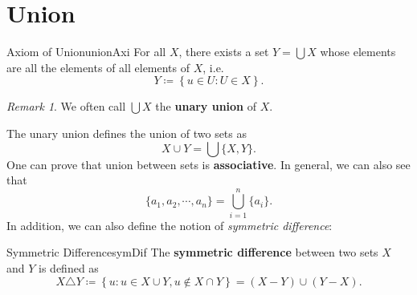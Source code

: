 \documentclass[math]{amznotes}
\theoremstyle{remark}
\newtheorem*{remark}{Remark}
\begin{document}
\section{Union}
\begin{axibox}{Axiom of Union}{unionAxi}
    For all $X$, there exists a set $Y = \bigcup X$ whose elements are all the elements of all elements of $X$, i.e.
    \begin{displaymath}
        Y \coloneqq \left\{u \in U \colon U \in X\right\}.
    \end{displaymath}
\end{axibox}
\begin{notebox}
    \begin{remark}
        We often call $\bigcup X$ the {\color{red} \textbf{unary union}} of $X$.
    \end{remark}
\end{notebox}
The unary union defines the union of two sets as 
\begin{equation*}
    X \cup Y = \bigcup\{X, Y\}.
\end{equation*}
One can prove that union between sets is \textbf{associative}. In general, we can also see that
\begin{equation*}
    \{a_1, a_2, \cdots, a_n\} = \bigcup_{i = 1}^n \{a_i\}.
\end{equation*}
In addition, we can also define the notion of \textit{symmetric difference}:
\begin{dfnbox}{Symmetric Difference}{symDif}
    The {\color{red} \textbf{symmetric difference}} between two sets $X$ and $Y$ is defined as 
    \begin{displaymath}
        X \triangle Y \coloneqq \left\{u \colon u \in X \cup Y, u \notin X \cap Y\right\} = (X - Y) \cup (Y - X).
    \end{displaymath}
\end{dfnbox}
\end{document}
